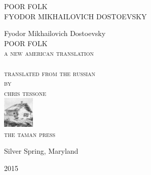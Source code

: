 \newlength{\drop}\setlength{\drop}{0.12\textheight}

\newcommand*{\firsttitle}{\begingroup
\centering
\vspace*{3em}
{\Large POOR FOLK}\\[\baselineskip]
{\Large FYODOR MIKHAILOVICH DOSTOEVSKY}
\vfill\null
\endgroup}

\newcommand*{\titleAM}{\begingroup
\centering
\vspace*{\drop}
{\large Fyodor Mikhailovich Dostoevsky}\\[\baselineskip]
{\Huge POOR FOLK}\\[\baselineskip]
{\scshape a new american translation}\\ \\
{\scshape translated from the russian}\\
{\scshape by}\\
{\scshape chris tessone}\\
\vfill%
{\scshape \includegraphics[width=1.5cm, height=1.5cm]{taman-press.png}}\\[0.5\baselineskip]
{\small\scshape the taman press}\par
{\small Silver Spring, Maryland}\par
{\small\scshape 2015}\par
\endgroup}

\firsttitle
\thispagestyle{empty}
\clearpage

\newpage\null\thispagestyle{empty}\newpage

\titleAM
\thispagestyle{empty}
\clearpage 
